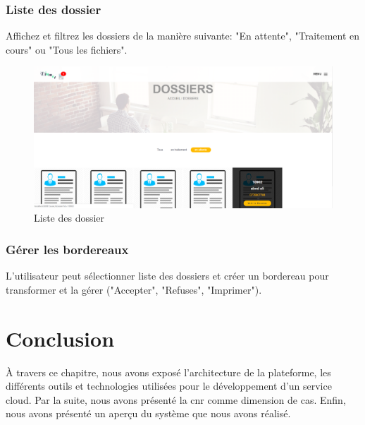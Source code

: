 \subsubsection{ Liste des dossier }
Affichez et filtrez les dossiers de la manière suivante: "En attente", "Traitement en cours" ou "Tous les fichiers".
\begin{figure}[H]
	\centering
	\includegraphics[width=1\linewidth]{images/captures/capturesuser/dossier}
	\caption{Liste des dossier}
	\label{fig:udossier}
\end{figure}


\subsubsection{ Gérer les  bordereaux }
L'utilisateur peut sélectionner liste des dossiers et créer un bordereau pour transformer et la gérer ("Accepter", "Refuses", "Imprimer").

 



\section{Conclusion}

À travers ce chapitre, nous avons exposé l’architecture de la plateforme, les différents outils et technologies utilisées pour le développement d'un service cloud. Par la suite, nous avons présenté la \ac{cnr} comme dimension de cas. Enfin, nous avons présenté un aperçu du système que nous avons réalisé.

